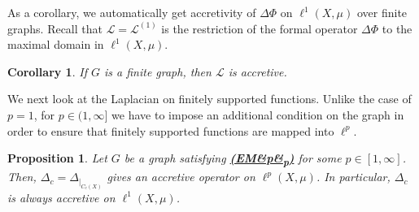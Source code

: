 \documentclass[letterpaper]{article}
\newtheorem{proposition}[lemma]{Proposition}
\newtheorem{corollary}[lemma]{Corollary}
\theoremstyle{definition}
\theoremstyle{named}
\numberwithin{equation}{section}
\newcommand{\EM}[1][]{\hyperlink{ass:EM}{\textup{\textbf{(EM\ifx&#1&\else\textsubscript{#1}\fi)}}}}
\newcommand{\Deltaphi}{\mathcal{L}}
\begin{document}
As a corollary, we automatically get accretivity of $\Delta \Phi$ on $\ell^1(X,\mu)$ 
over finite graphs. Recall that $\Deltaphi=\Deltaphi^{(1)}$
is the restriction of the formal operator $\Delta \Phi$ to the maximal domain in $\ell^1(X,\mu)$.
\begin{corollary}\label{c:PMTO_accretive_finite}
    If $G$ is a finite graph, then $\Deltaphi$ is accretive.
\end{corollary}



We next look at the Laplacian on finitely supported functions. Unlike the case
of $p=1$, for $p \in (1,\infty]$ we have to impose an additional condition
on the graph in order to ensure that finitely supported functions are mapped into
$\ell^p$.
\begin{proposition}\label{p:Lap_accretivity_Cc}
    Let $G$ be a graph satisfying \EM[p] for some $p \in [1, \infty]$. Then, $\Delta_c = \Delta_{\vert_{C_c(X)}}$
    gives an accretive operator on $\ell^p(X,\mu)$. In particular, $\Delta_c$ is always accretive on $\ell^1(X,\mu)$.
\end{proposition}
\end{document}
